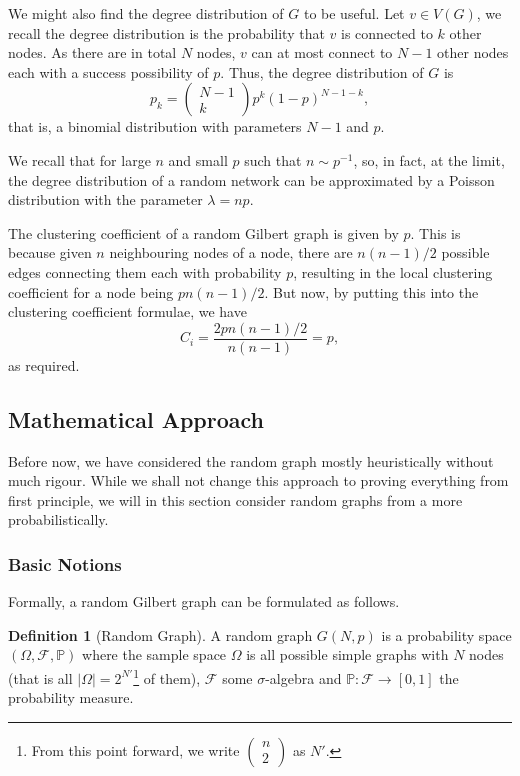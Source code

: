 \documentclass[
]{article}
\theoremstyle{definition}
\newtheorem{definition}{Definition}[section]
\begin{document}
We might also find the degree distribution of \(G\) to be useful. Let
\(v \in V(G)\), we recall the degree distribution is the probability
that \(v\) is connected to \(k\) other nodes. As there are in total
\(N\) nodes, \(v\) can at most connect to \(N - 1\) other nodes each
with a success possibility of \(p\). Thus, the degree distribution of
\(G\) is
\[p_k = \begin{pmatrix} N - 1 \\ k \end{pmatrix} p^k (1 - p)^{N - 1 - k}, \]
that is, a binomial distribution with parameters \(N - 1\) and \(p\).

We recall that for large \(n\) and small \(p\) such that
\(n \sim p^{-1}\), so, in fact, at the limit, the degree distribution of
a random network can be approximated by a Poisson distribution with the
parameter \(\lambda = np\).

The clustering coefficient of a random Gilbert graph is given by \(p\).
This is because given \(n\) neighbouring nodes of a node, there are
\(n (n - 1) / 2\) possible edges connecting them each with probability
\(p\), resulting in the local clustering coefficient for a node being
\(p n (n - 1) / 2\). But now, by putting this into the clustering
coefficient formulae, we have
\[C_i = \frac{2 p n (n - 1) / 2}{n (n - 1)} = p,\] as required.

\hypertarget{mathematical-approach}{%
\subsection{Mathematical Approach}\label{mathematical-approach}}

Before now, we have considered the random graph mostly heuristically
without much rigour. While we shall not change this approach to proving
everything from first principle, we will in this section consider random
graphs from a more probabilistically.

\hypertarget{basic-notions}{%
\subsubsection{Basic Notions}\label{basic-notions}}

Formally, a random Gilbert graph can be formulated as follows.

\begin{definition}[Random Graph]
  A random graph \(G(N, p)\) is a probability space \((\Omega, \mathcal{F}, \mathbb{P})\) 
  where the sample space \(\Omega\) is all possible simple graphs with \(N\) 
  nodes (that is all \(\left| \Omega \right| = 2^{N'}\)\footnote{From this point 
  forward, we write \(\begin{pmatrix} n \\ 2 \end{pmatrix}\) as \(N'\).} of them), 
  \(\mathcal{F}\) some \(\sigma\)-algebra and \(\mathbb{P} : \mathcal{F} \to [0, 1]\) 
  the probability measure. 
\end{definition}
\end{document}
